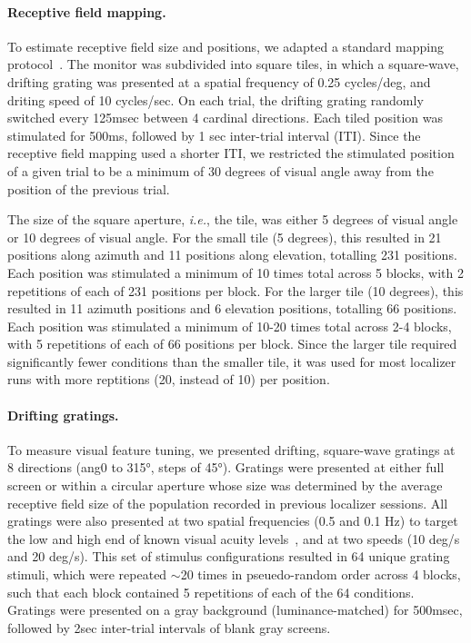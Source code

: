 \paragraph{Receptive field mapping.}
To estimate receptive field size and positions, we adapted a standard mapping protocol~\cite{Marques2018}. The monitor was subdivided into square tiles, in which a square-wave, drifting grating was presented at a spatial frequency of 0.25 cycles/deg, and driting speed of 10 cycles/sec. On each trial, the drifting grating randomly switched every 125msec between 4 cardinal directions. Each tiled position was stimulated for 500ms, followed by 1 sec inter-trial interval (ITI). Since the receptive field mapping used a shorter ITI, we restricted the stimulated position of a given trial to be a minimum of 30 degrees of visual angle away from the position of the previous trial. 

The size of the square aperture, \textit{i.e.}, the tile, was either 5 degrees of visual angle or 10 degrees of visual angle. For the small tile (5 degrees), this resulted in 21 positions along azimuth and 11 positions along elevation, totalling 231 positions. Each position was stimulated a minimum of 10 times total across 5 blocks, with 2 repetitions of each of 231 positions per block. For the larger tile (10 degrees), this resulted in 11 azimuth positions and 6 elevation positions, totalling 66 positions. Each position was stimulated a minimum of 10-20 times total across 2-4 blocks, with 5 repetitions of each of 66 positions per block. Since the larger tile required significantly fewer conditions than the smaller tile, it was used for most localizer runs with more reptitions (20, instead of 10) per position. 

\paragraph{Drifting gratings.}
To measure visual feature tuning, we presented drifting, square-wave gratings at 8 directions (ang{0} to \ang{315}, steps of \ang{45}). Gratings were presented at either full screen or within a circular aperture whose size was determined by the average receptive field size of the population recorded in previous localizer sessions. All gratings were also presented at two spatial frequencies (0.5 and 0.1 Hz) to target the low and high end of known visual acuity levels~\cite{Prusky2000}, and at two speeds (10 deg/s and 20 deg/s). This set of stimulus configurations resulted in 64 unique grating stimuli, which were repeated $\sim$20 times in pseuedo-random order across 4 blocks, such that each block contained 5 repetitions of each of the 64 conditions. Gratings were presented on a gray background (luminance-matched) for 500msec, followed by 2sec inter-trial intervals of blank gray screens. 

